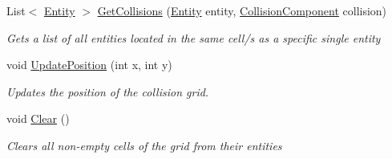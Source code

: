 \begin{DoxyCompactItemize}
List$<$ \hyperlink{class_midnight_blue_1_1_engine_1_1_entity_component_1_1_entity}{Entity} $>$ \hyperlink{class_midnight_blue_1_1_engine_1_1_collision_1_1_collision_map_ac6cb425b42914d6035b917d056ad8773}{Get\+Collisions} (\hyperlink{class_midnight_blue_1_1_engine_1_1_entity_component_1_1_entity}{Entity} entity, \hyperlink{class_midnight_blue_1_1_engine_1_1_entity_component_1_1_collision_component}{Collision\+Component} collision)
\begin{DoxyCompactList}\small\item\em Gets a list of all entities located in the same cell/s as a specific single entity \end{DoxyCompactList}\item 
void \hyperlink{class_midnight_blue_1_1_engine_1_1_collision_1_1_collision_map_a7d387825607acea56ea40b3c84b34169}{Update\+Position} (int x, int y)
\begin{DoxyCompactList}\small\item\em Updates the position of the collision grid. \end{DoxyCompactList}\item 
void \hyperlink{class_midnight_blue_1_1_engine_1_1_collision_1_1_collision_map_ab8ef33abaee3cfbe9f15dd73fda3cf6e}{Clear} ()
\begin{DoxyCompactList}\small\item\em Clears all non-\/empty cells of the grid from their entities \end{DoxyCompactList}\end{DoxyCompactItemize}
